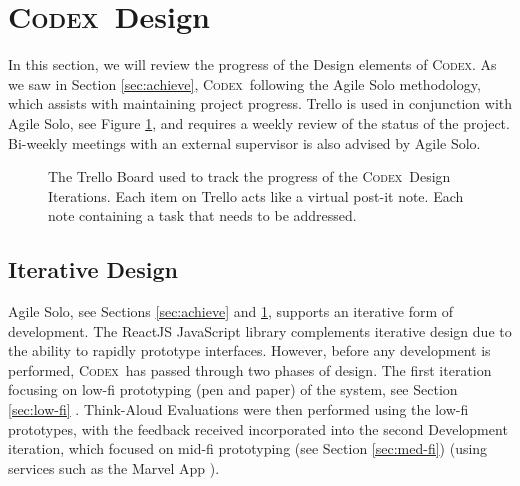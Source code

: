 \documentclass[progress]{cmpreport}
\newcommand{\Codex}{\textsc{Codex}}
\begin{document}
	\section{\Codex \ Design} \label{sec:design}
	In this section, we will review the progress of the Design elements of \Codex. As we saw in Section \ref{sec:achieve}, \Codex \ following the Agile Solo methodology, which assists with maintaining project progress. Trello is used in conjunction with Agile Solo, see Figure \ref{fig:trello-board}, and requires a weekly review of the status of the project. Bi-weekly meetings with an external supervisor is also advised by Agile Solo.  
	
	\begin{figure}
		\centering
		\caption{The Trello Board used to track the progress of the \Codex \ Design Iterations. Each item on Trello acts like a virtual post-it note. Each note containing a task that needs to be addressed.} \label{fig:trello-board}
	\end{figure}
	
		\subsection{Iterative Design} \label{sec:iterative}
		Agile Solo, see Sections \ref{sec:achieve} and \ref{sec:design}, supports an iterative form of development. The ReactJS JavaScript library complements iterative design due to the ability to rapidly prototype interfaces. However, before any development is performed, \Codex \ has passed through two phases of design. The first iteration focusing on low-fi prototyping (pen and paper) of the system, see Section \ref{sec:low-fi} . Think-Aloud Evaluations were then performed using the low-fi prototypes, with the feedback received incorporated into the second Development iteration, which focused on mid-fi prototyping (see Section \ref{sec:med-fi}) (using services such as the Marvel App \citep{marvelapp}).
	
\end{document}
